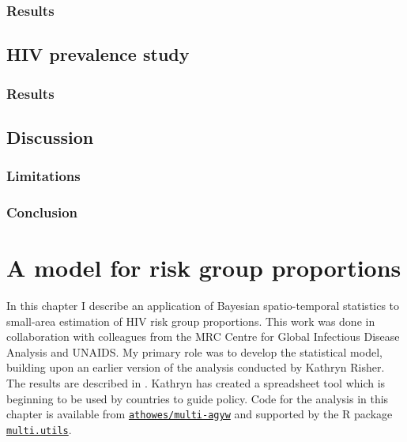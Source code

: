 \documentclass[a4paper, nobind]{templates/ociamthesis}
\begin{document}
\hypertarget{results}{%
\subsection{Results}\label{results}}

\hypertarget{hiv-prevalence-study}{%
\section{HIV prevalence study}\label{hiv-prevalence-study}}

\hypertarget{results-1}{%
\subsection{Results}\label{results-1}}

\hypertarget{discussion}{%
\section{Discussion}\label{discussion}}

\hypertarget{limitations}{%
\subsection{Limitations}\label{limitations}}

\hypertarget{conclusion}{%
\subsection{Conclusion}\label{conclusion}}

\hypertarget{multi-agyw}{%
\chapter{A model for risk group proportions}\label{multi-agyw}}

\adjustmtc
{}

In this chapter I describe an application of Bayesian spatio-temporal statistics to small-area estimation of HIV risk group proportions.
This work was done in collaboration with colleagues from the MRC Centre for Global Infectious Disease Analysis and UNAIDS.
My primary role was to develop the statistical model, building upon an earlier version of the analysis conducted by Kathryn Risher.
The results are described in \textcite{howes2023spatio}.
Kathryn has created a spreadsheet tool which is beginning to be used by countries to guide policy.
Code for the analysis in this chapter is available from \href{https://github.com/athowes/multi-agyw}{\texttt{athowes/multi-agyw}} and supported by the R package \href{https://athowes.github.io/multi.utils}{\texttt{multi.utils}}.
\end{document}
